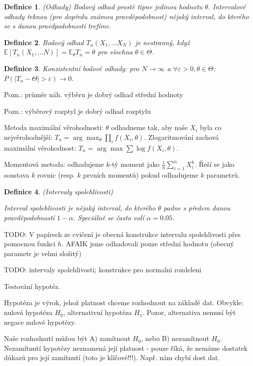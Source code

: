 \documentclass[a4paper,10pt,titlepage]{article} \usepackage[utf8]{inputenc}
\newtheorem{define}{Definice}
\begin{document}
\begin{define}(Odhady)
Bodový odhad prostě tipne jedinou hodnotu $\theta$. Intervalové odhady řeknou 
(pro dopředu známou pravděpodobnost) nějaký interval, do kterého se s danou
pravdpodobností trefíme.
\end{define}

\begin{define}
Bodový odhad $T_n(X_1,\ldots X_N)$ je nestranný, když $\mathbb{E}[T_n(X_1,\ldots
N)]=\mathbb{E}_{\theta}T_n=\theta$ pro všechna $\theta\in\Theta$.
\end{define}

\begin{define}
Konzistentní bodové odhady: pro $N\rightarrow\infty$ a $\forall\varepsilon>0,
\theta\in\Theta$:
$P(|T_n-\Theta|>\varepsilon)\rightarrow 0$.
\end{define}

Pozn.: průměr náh. výběru je dobrý odhad střední hodnoty

Pozn.: výběrový rozptyl je dobrý odhad rozptylu

Metoda maximální věrohodnosti: $\theta$ odhadneme tak, aby naše $X_i$ byla
co nejvěrohodnější: $T_n=\arg\max_\theta \prod_{i} f(X_i,\theta)$.
Zlogaritmování zachová maximální věrohodnost: $T_n=\arg\max\sum\log
f(X_i,\theta)$.

Momentová metoda: odhadujeme $k$-tý moment jako $\frac{1}{n}\sum_{i=1}^n X_i^k$.
Řeší se jako soustava $k$ rovnic (resp. $k$ prvních momentů) pokud odhadujeme
$k$ parametrů.

\begin{define}(Intervaly spolehlivosti)

Interval spolehlivosti je nějaký interval, do kterého $\theta$ padne
s předem danou pravděpodobností $1-\alpha$. Speciálně se často volí
$\alpha=0.05$.
\end{define}

TODO: V papírech ze cvičení je obecná konstrukce intervalu spolehlivosti
přes pomocnou funkci $h$. AFAIK jsme odhadovali pouze střední hodnotu
(obecný parametr je velmi složitý)

TODO: intervaly spolehlivosti; konstrukce pro normalni rozdeleni

Testování hypotéz.

Hypotéza je výrok, jehož platnost chceme rozhodnout na základě dat.
Obvykle: nulová hypotéza $H_0$, alternativní hypotéza $H_1$. Pozor,
alternativa nemusí být negace nulové hypotézy.

Naše rozhodnutí můžou být A) zamítnout $H_0$, nebo B) nezamítnout $H_0$.
Nezamítnutí hypotézy neznamená její platnost - pouze říká, že nemáme dostatek
důkazů pro její zamítnutí (toto je klíčové!!!). Např. nám chybí dost dat.
\end{document}
